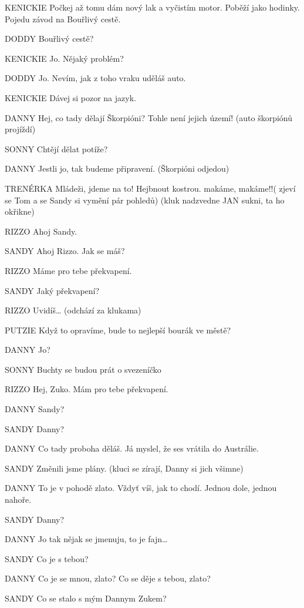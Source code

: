 KENICKIE        Počkej až tomu dám nový lak a vyčistím motor. Poběží jako hodinky.                     Pojedu závod na Bouřlivý cestě. 

DODDY        Bouřlivý cestě?

KENICKIE        Jo. Nějaký problém?

DODDY        Jo. Nevím, jak z toho vraku uděláš auto. 

KENICKIE        Dávej si pozor na jazyk.

DANNY        Hej, co tady dělají Škorpióni? Tohle není jejich území! (auto škorpiónů         projíždí)

SONNY          Chtějí dělat potíže?

DANNY         Jestli jo, tak budeme připravení. (Škorpióni odjedou)

TRENÉRKA        Mládeži, jdeme na to! Hejbnout kostrou. makáme, makáme!!( zjeví se Tom a se Sandy si vymění pár pohledů)  (kluk nadzvedne JAN sukni, ta ho okřikne)

RIZZO        Ahoj Sandy.

SANDY        Ahoj Rizzo. Jak se máš?

RIZZO        Máme pro tebe překvapení.

SANDY        Jaký překvapení?

RIZZO        Uvidíš…    (odchází za klukama)

PUTZIE        Když to opravíme, bude to nejlepší bourák ve městě?

DANNY        Jo?

SONNY        Buchty se budou prát o svezeníčko

RIZZO        Hej, Zuko. Mám pro tebe překvapení.

DANNY        Sandy?

SANDY        Danny?

DANNY        Co tady proboha děláš. Já myslel, že ses vrátila do Austrálie. 

SANDY        Změnili jsme plány. (kluci se zírají, Danny si jich všimne)

DANNY        To je v pohodě zlato. Vždyť víš, jak to chodí. Jednou dole, jednou nahoře. 

SANDY        Danny?

DANNY        Jo tak nějak se jmenuju, to je fajn…

SANDY        Co je s tebou?

DANNY        Co je se mnou, zlato? Co se děje s tebou, zlato?

SANDY        Co se stalo s mým Dannym Zukem?

